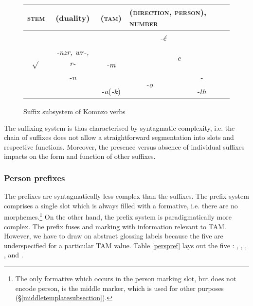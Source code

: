 \begin{figure}
\begin{center}%
	\begin{tabular}{|c|c|c|c|c|}
		\midrule
		\textsc{stem}&{(duality)}&\multicolumn{1}{l|}{\textsc{(tam)}}&\multicolumn{2}{l|}{\textsc{(direction, person), number}}\\ \midrule
		\multirow{4}{*}{$\sqrt{}$}&&\multicolumn{3}{c|}{\emph{-é}}\\ \cline{3-5}
		&\emph{-nzr, wr-, r-} & \multirow{2}{*}{\emph{-m}}&  \multicolumn{2}{c|}{\emph{-e}}\\\cline{4-5}
		&\emph{-n} &&\multirow{2}{*}{\emph{-o}} & \emph{-\Zero}\\\cline{3-3}\cline{5-5}
		&&\multicolumn{1}{c|}{\emph{-a}(\emph{-k})} & & \emph{-th}\\
		\midrule
	\end{tabular}
\end{center}
\caption{Suffix subsystem of Komnzo verbs}\label{suffsubsys}
\end{figure}%

The suffixing system is thus characterised by syntagmatic complexity, i.e. the chain of suffixes does not allow a straightforward segmentation into slots and respective functions. Moreover, the presence versus absence of individual suffixes impacts on the form and function of other suffixes.

\subsubsection{Person prefixes} \label{personprefsection}

The  prefixes are syntagmatically less complex than the  suffixes. The prefix system comprises a single slot which is always filled with a formative, i.e. there are no  morphemes.\footnote{The only formative which occurs in the person marking slot, but does not encode person, is the middle marker, which is used for other purposes (\S{}\ref{middletemplatesubsection}).} On the other hand, the prefix system is paradigmatically more complex. The prefix fuses  and  marking with information relevant to TAM. However, we have to draw on abstract glossing labels because the five  are underspecified for a particular TAM value. Table \ref{perspref} lays out the five : \Alph, \Bet, \Betaone, \Betatwo, and \Gam.

